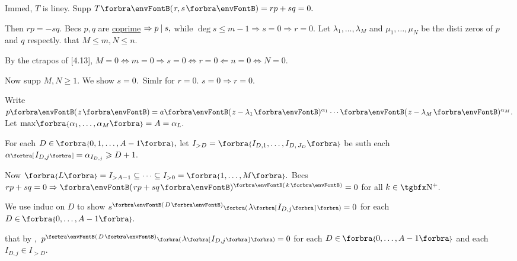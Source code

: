 Immed, $T$ is liney. \;Supp $T\Par{r,s}=rp+sq=0.$\par\quad
Then $rp=-sq.$ Becs $p,q$ are \uline{coprime} $\Rightarrow p\:\text{\normalsize|}\:s,$ while $\deg s\leqslant m-1\Rightarrow s=0\Rightarrow r=0.$\PfEnd\vspace{6pt}\quad
\Or Let $\lambda_1,\dots,\lambda_M$ and $\mu_1,\dots,\mu_N$ be the disti zeros of $p$ and $q$ respectly. \NOTICE that $M\leqslant m,N\leqslant n.$\vspace{2pt}\par\quad
By the ctrapos of [4.13], $M=0\Longleftrightarrow m=0\Rightarrow s=0\Longleftrightarrow r=0 \Leftarrow n=0\Longleftrightarrow N=0.$\vspace{2pt}\par\quad
Now supp $M,N\geqslant 1.$ We show $s=0.$ \,{\FontSmall Simlr for $r=0.$ \Or $s=0\Rightarrow r=0.$}\vspace{2pt}\par\quad
Write $p\Par{z}=a\Par{z-\lambda_1}{^{\alpha_1}}\cdots\Par{z-\lambda_M}{^{\alpha_M}}.$  Let $\max\!\Bra{\alpha_1,\dots,\alpha_M}=A=\alpha_L.$\vspace{2pt}\par\quad
For each $D\in\;\!\!\Bra{0,1,\dots,A-1},$ let $I_{>D}=\Bra{{I_{D,1}},\dots,{I_{D,\,J_D}}}$ be suth each $\alpha\Sbra{I_{D,j}}=\alpha_{I_{D,j}}\geqslant D+1.$\vspace{2pt}\par\quad
Now $\Bra{L}=I_{>A-1}\subseteq \cdots\subseteq I_{>0}=\Bra{1,\dots,M}.$ Becs $rp+sq=0\Rightarrow\Par{rp+sq}{^{\SmallPar{k}}}=0$ for all $k\in\Nbp.$\vspace{2pt}\par\quad
We use induc on $D$ to show $s{^{\SmallPar{D}}}\BigPar{\lambda\Sbra{I_{D,j}}}=0$ for each $D\in\;\!\!\Bra{0,\dots,A-1}.$\vspace{2pt}\par\quad
\NOTICE that by , \,$p{^{\SmallPar{D}}}\BigPar{\lambda\Sbra{I_{D,j}}}=0$ for each $D\in\;\!\!\Bra{0,\dots,A-1}$ and each $I_{D,j}\in I_{>D}.$\vspace{2pt}\par\quad

